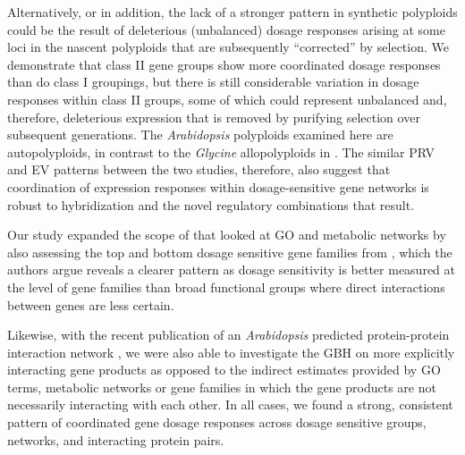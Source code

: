 \documentclass[11pt]{article}
\begin{document}
Alternatively, or in addition, the lack of a stronger pattern in synthetic polyploids could be the result of deleterious (unbalanced) dosage responses arising at some loci in the nascent polyploids that are subsequently ``corrected'' by selection. We demonstrate that class II gene groups show more coordinated dosage responses than do class I groupings, but there is still considerable variation in dosage responses within class II groups, some of which could represent unbalanced and, therefore, deleterious expression that is removed by purifying selection over subsequent generations. 
The {\it Arabidopsis} polyploids examined here are autopolyploids, in contrast to the {\it Glycine} allopolyploids in \cite{coate2016}. The similar PRV and EV patterns between the two studies, therefore, also suggest that coordination of expression responses within dosage-sensitive gene networks is robust to hybridization and the novel regulatory combinations that result.

Our study expanded the scope of \cite{coate2016} that looked at GO and metabolic networks by also assessing the top and bottom dosage sensitive gene families from \cite{tashdighian2017}, which the authors argue reveals a clearer pattern as dosage sensitivity is better measured at the level of gene families than broad functional groups where direct interactions between genes are less certain. 

Likewise, with the recent publication of an {\it Arabidopsis} predicted protein-protein interaction network \citep{dong2019}, we were also able to investigate the GBH on more explicitly interacting gene products as opposed to the indirect estimates provided by GO terms, metabolic networks or gene families  in which the gene products are not necessarily interacting with each other. In all cases, we found a strong, consistent pattern of coordinated gene dosage responses across dosage sensitive groups, networks, and interacting protein pairs.
\end{document}
